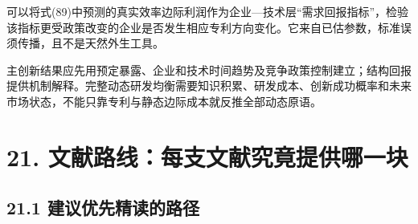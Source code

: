 \documentclass[
  11pt,
]{article}
\begin{document}
可以将式(89)中预测的真实效率边际利润作为企业---技术层``需求回报指标''，检验该指标更受政策改变的企业是否发生相应专利方向变化。它来自已估参数，标准误须传播，且不是天然外生工具。

主创新结果应先用预定暴露、企业和技术时间趋势及竞争政策控制建立；结构回报提供机制解释。完整动态研发均衡需要知识积累、研发成本、创新成功概率和未来市场状态，不能只靠专利与静态边际成本就反推全部动态原语。

\section{21.
文献路线：每支文献究竟提供哪一块}\label{ux6587ux732eux8defux7ebfux6bcfux652fux6587ux732eux7a76ux7adfux63d0ux4f9bux54eaux4e00ux5757}

\subsection{21.1
建议优先精读的路径}\label{ux5efaux8baeux4f18ux5148ux7cbeux8bfbux7684ux8defux5f84}
\end{document}
